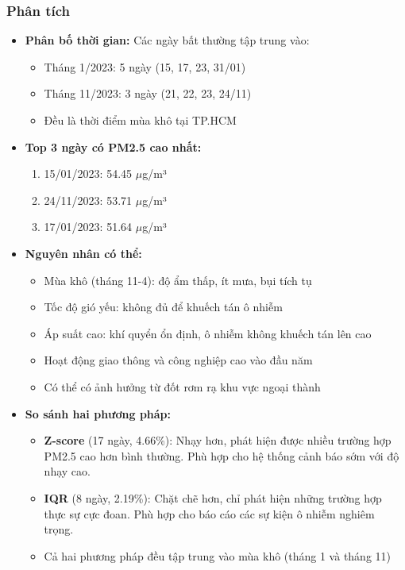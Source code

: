 \documentclass[12pt,a4paper]{article}
\begin{document}
\subsubsection{Phân tích}
\begin{itemize}
    \item \textbf{Phân bố thời gian:} Các ngày bất thường tập trung vào:
    \begin{itemize}
        \item Tháng 1/2023: 5 ngày (15, 17, 23, 31/01)
        \item Tháng 11/2023: 3 ngày (21, 22, 23, 24/11)
        \item Đều là thời điểm mùa khô tại TP.HCM
    \end{itemize}
    
    \item \textbf{Top 3 ngày có PM2.5 cao nhất:}
    \begin{enumerate}
        \item 15/01/2023: 54.45 $\mu$g/m³
        \item 24/11/2023: 53.71 $\mu$g/m³
        \item 17/01/2023: 51.64 $\mu$g/m³
    \end{enumerate}
    
    \item \textbf{Nguyên nhân có thể:}
    \begin{itemize}
        \item Mùa khô (tháng 11-4): độ ẩm thấp, ít mưa, bụi tích tụ
        \item Tốc độ gió yếu: không đủ để khuếch tán ô nhiễm
        \item Áp suất cao: khí quyển ổn định, ô nhiễm không khuếch tán lên cao
        \item Hoạt động giao thông và công nghiệp cao vào đầu năm
        \item Có thể có ảnh hưởng từ đốt rơm rạ khu vực ngoại thành
    \end{itemize}
    
    \item \textbf{So sánh hai phương pháp:}
    \begin{itemize}
        \item \textbf{Z-score} (17 ngày, 4.66\%): Nhạy hơn, phát hiện được nhiều trường hợp PM2.5 cao hơn bình thường. Phù hợp cho hệ thống cảnh báo sớm với độ nhạy cao.
        \item \textbf{IQR} (8 ngày, 2.19\%): Chặt chẽ hơn, chỉ phát hiện những trường hợp thực sự cực đoan. Phù hợp cho báo cáo các sự kiện ô nhiễm nghiêm trọng.
        \item Cả hai phương pháp đều tập trung vào mùa khô (tháng 1 và tháng 11)
    \end{itemize}
    

\end{itemize}
\end{document}
